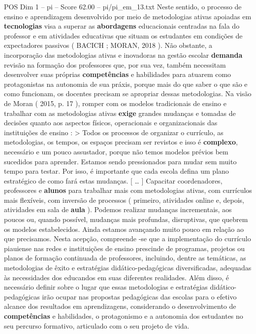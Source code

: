 \begin{textsample}{POS Dim 1 – pi – Score 62.00 – pi/pi\_em\_13.txt}
Neste sentido, o processo de ensino e aprendizagem desenvolvido por meio de metodologias ativas apoiadas em \textbf{tecnologias} visa a superar as \textbf{abordagens} educacionais centradas na fala do professor e em atividades educativas que situam os estudantes em condições de expectadores passivos ( BACICH ; MORAN, 2018 ).
Não obstante, a incorporação das metodologias ativas e inovadoras na gestão escolar \textbf{demanda} revisão na formação dos professores que, por sua vez, também necessitam desenvolver suas próprias \textbf{competências} e habilidades para atuarem como protagonistas na autonomia de sua práxis, porque mais do que saber o que são e como funcionam, os docentes precisam se apropriar dessas metodologias.
Na visão de Moran ( 2015, p. 17 ), romper com os modelos tradicionais de ensino e trabalhar com as metodologias ativas \textbf{exige} grandes mudanças e tomadas de decisões quanto aos aspectos físicos, operacionais e organizacionais das instituições de ensino : > Todos os processos de organizar o currículo, as metodologias, os tempos, os espaços precisam ser revistos e isso é \textbf{complexo}, necessário e um pouco assustador, porque não temos modelos prévios bem sucedidos para aprender.
Estamos sendo pressionados para mudar sem muito tempo para testar.
Por isso, é importante que cada escola defina um plano estratégico de como fará estas mudanças. [ … ] Capacitar coordenadores, professores e \textbf{alunos} para trabalhar mais com metodologias ativas, com currículos mais flexíveis, com inversão de processos ( primeiro, atividades online e, depois, atividades em sala de \textbf{aula} ).
Podemos realizar mudanças incrementais, aos poucos ou, quando possível, mudanças mais profundas, disruptivas, que quebrem os modelos estabelecidos.
Ainda estamos avançando muito pouco em relação ao que precisamos.
Nesta acepção, compreende -se que a implementação do currículo piauiense nas redes e instituições de ensino prescinde de programas, projetos ou planos de formação continuada de professores, incluindo, dentre as temáticas, as metodologias de êxito e estratégias didático-pedagógicas diversificadas, adequadas às necessidades dos educandos em suas diferentes realidades.
Além disso, é necessário definir sobre o lugar que essas metodologias e estratégias didático-pedagógicas irão ocupar nas propostas pedagógicas das escolas para o efetivo alcance dos resultados em aprendizagens, considerando o desenvolvimento de \textbf{competências} e habilidades, o protagonismo e a autonomia dos estudantes no seu percurso formativo, articulado com o seu projeto de vida.

\end{textsample}
